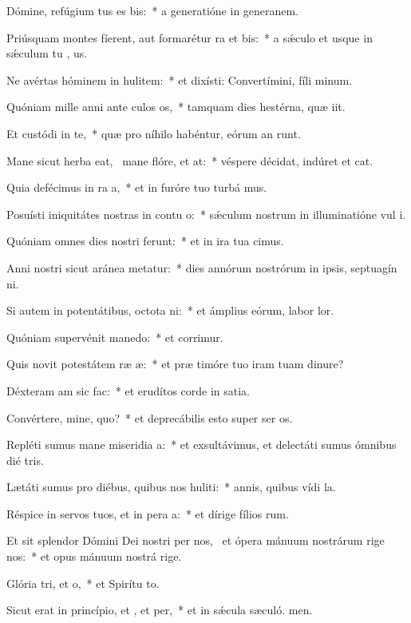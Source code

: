 \item Dómine, refúgium tus es bis:~* a generatióne in generanem.
\item Priúsquam montes fíerent, aut formarétur ra et bis:~* a sǽculo et usque in sǽculum tu , us.
\item Ne avértas hóminem in hulitem:~* et dixísti: Convertímini, fíli minum.
\item Quóniam mille anni ante culos os,~* tamquam dies hestérna, quæ iit.
\item Et custódi in te,~* quæ pro níhilo habéntur, eórum an runt.
\item Mane sicut herba eat,~\pscross{} mane flóre, et at:~* véspere décidat, indúret et cat.
\item Quia defécimus in ra a,~* et in furóre tuo turbá mus.
\item Posuísti iniquitátes nostras in contu o:~* sǽculum nostrum in illuminatióne vul i.
\item Quóniam omnes dies nostri ferunt:~* et in ira tua cimus.
\item Anni nostri sicut aránea metatur:~* dies annórum nostrórum in ipsis, septuagín ni.
\item Si autem in potentátibus, octota ni:~* et ámplius eórum, labor  lor.
\item Quóniam supervénit manedo:~* et corrimur.
\item Quis novit potestátem ræ æ:~* et præ timóre tuo iram tuam dinure?
\item Déxteram am sic  fac:~* et erudítos corde in satia.
\item Convértere, mine, quo?~* et deprecábilis esto super ser os.
\item Repléti sumus mane miseridia a:~* et exsultávimus, et delectáti sumus ómnibus dié tris.
\item Lætáti sumus pro diébus, quibus nos huliti:~* annis, quibus vídi la.
\item Réspice in servos tuos, et in pera a:~* et dírige fílios rum.
\item Et sit splendor Dómini Dei nostri per nos,~\pscross{} et ópera mánuum nostrárum rige  nos:~* et opus mánuum nostrá rige.
\item Glória tri, et o,~* et Spirítu to.
\item Sicut erat in princípio, et , et per,~* et in sǽcula sæculó. men.

